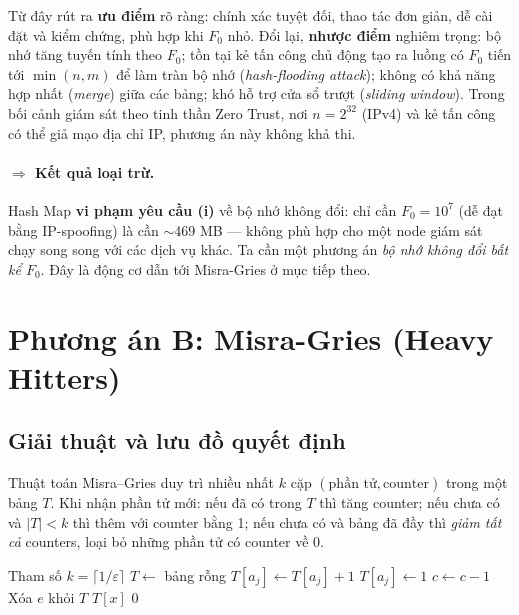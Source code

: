 Từ đây rút ra \textbf{ưu điểm} rõ ràng: chính xác tuyệt đối, thao tác đơn giản, dễ cài đặt và kiểm chứng, phù hợp khi $F_0$ nhỏ. Đổi lại, \textbf{nhược điểm} nghiêm trọng: bộ nhớ tăng tuyến tính theo $F_0$; tồn tại kẻ tấn công chủ động tạo ra luồng có $F_0$ tiến tới $\min(n, m)$ để làm tràn bộ nhớ (\textit{hash-flooding attack}); không có khả năng hợp nhất (\textit{merge}) giữa các bảng; khó hỗ trợ cửa sổ trượt (\textit{sliding window}). Trong bối cảnh giám sát theo tinh thần Zero Trust, nơi $n = 2^{32}$ (IPv4) và kẻ tấn công có thể giả mạo địa chỉ IP, phương án này không khả thi.

\paragraph{$\Rightarrow$ Kết quả loại trừ.}
Hash Map \textbf{vi phạm yêu cầu (i)} về bộ nhớ không đổi: chỉ cần $F_0 = 10^7$ (dễ đạt bằng IP-spoofing) là cần $\sim$469 MB --- không phù hợp cho một node giám sát chạy song song với các dịch vụ khác. Ta cần một phương án \textit{bộ nhớ không đổi bất kể $F_0$}. Đây là động cơ dẫn tới Misra-Gries ở mục tiếp theo.

\section{Phương án B: Misra-Gries (Heavy Hitters)}
\label{sec:mg}

\subsection{Giải thuật và lưu đồ quyết định}

Thuật toán Misra--Gries \cite{misra1982finding} duy trì nhiều nhất $k$ cặp $(\text{phần tử}, \text{counter})$ trong một bảng $T$. Khi nhận phần tử mới: nếu đã có trong $T$ thì tăng counter; nếu chưa có và $|T| < k$ thì thêm với counter bằng 1; nếu chưa có và bảng đã đầy thì \textit{giảm tất cả} counters, loại bỏ những phần tử có counter về 0.

\begin{algorithm}[H]
\caption{Misra-Gries --- UPDATE và QUERY}
\label{alg:misra-gries}
\begin{algorithmic}[1]
\Require Tham số $k = \lceil 1/\varepsilon \rceil$
\State $T \gets$ bảng rỗng 
\Statex
{}
        \State $T[a_j] \gets T[a_j] + 1$
        \State $T[a_j] \gets 1$
    \Else
         
            \State $c \gets c - 1$
                \State Xóa $e$ khỏi $T$
            \EndIf
        \EndFor
    \EndIf
\EndFunction
\Statex
{}
        \State \Return $T[x]$
    \Else
        \State \Return $0$
    \EndIf
\EndFunction
\end{algorithmic}
\end{algorithm}

